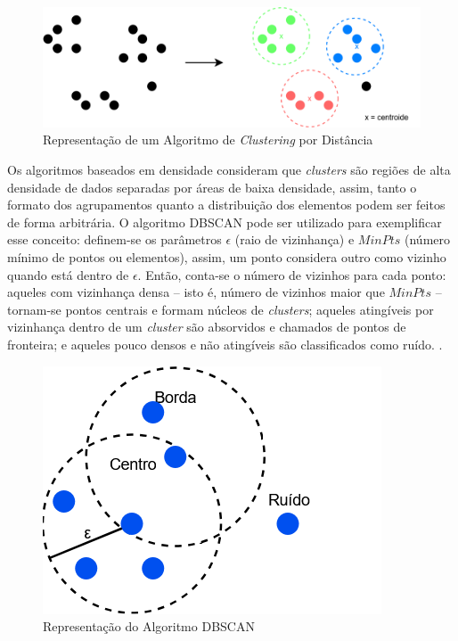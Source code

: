 \begin{figure}[H]
	\caption{\label{fig:kmeans}Representação de um Algoritmo de \textit{Clustering} por Distância}
    \begin{center}
    \includegraphics[width=1\linewidth]{images/kmeans.png}
	\end{center}
\end{figure}

Os algoritmos baseados em densidade consideram que \textit{clusters} são regiões de alta densidade de dados separadas por áreas de baixa densidade, assim, tanto o formato dos agrupamentos quanto a distribuição dos elementos podem ser feitos de forma arbitrária. O algoritmo DBSCAN pode ser utilizado para exemplificar esse conceito: definem-se os parâmetros $\epsilon$ (raio de vizinhança) e $MinPts$ (número mínimo de pontos ou elementos), assim, um ponto considera outro como vizinho quando está dentro de $\epsilon$. Então, conta-se o número de vizinhos para cada ponto: aqueles com vizinhança densa -- isto é, número de vizinhos maior que $MinPts$ -- tornam-se pontos centrais e formam núcleos de \textit{clusters}; aqueles atingíveis por vizinhança dentro de um \textit{cluster} são absorvidos e chamados de pontos de fronteira; e aqueles pouco densos e não atingíveis são classificados como ruído. \cite{cluster1}.

\begin{figure}[H]
	\caption{\label{fig:dbscan}Representação do Algoritmo DBSCAN}
    \begin{center}
    \includegraphics[width=.5\linewidth]{images/dbscan.png}
	\end{center}
\end{figure}


